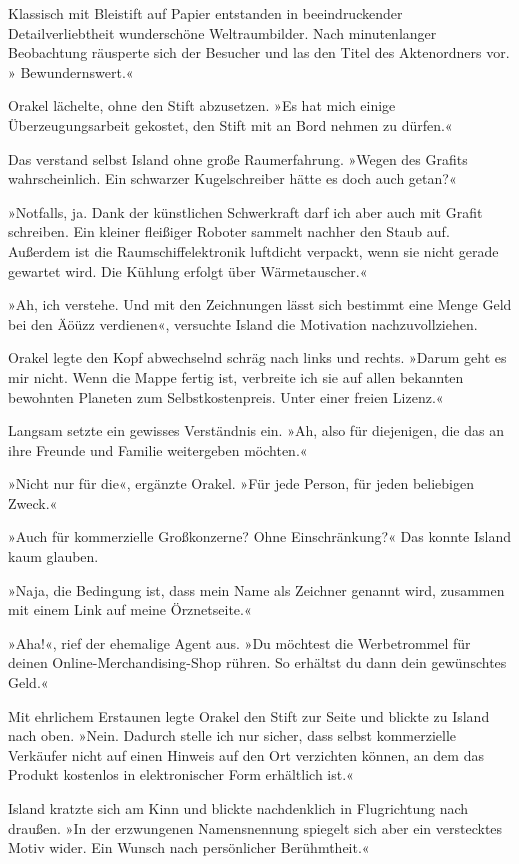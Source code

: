 Klassisch mit Bleistift auf Papier entstanden in beeindruckender Detailverliebtheit wunderschöne Weltraumbilder. Nach minutenlanger Beobachtung räusperte sich der Besucher und las den Titel des Aktenordners vor. » Bewundernswert.«

Orakel lächelte, ohne den Stift abzusetzen. »Es hat mich einige Überzeugungsarbeit gekostet, den Stift mit an Bord nehmen zu dürfen.«

Das verstand selbst Island ohne große Raumerfahrung. »Wegen des Grafits wahrscheinlich. Ein schwarzer Kugelschreiber hätte es doch auch getan?«

»Notfalls, ja. Dank der künstlichen Schwerkraft darf ich aber auch mit Grafit schreiben. Ein kleiner fleißiger Roboter sammelt nachher den Staub auf. Außerdem ist die Raumschiffelektronik luftdicht verpackt, wenn sie nicht gerade gewartet wird. Die Kühlung erfolgt über Wärmetauscher.«

»Ah, ich verstehe. Und mit den Zeichnungen lässt sich bestimmt eine Menge Geld bei den Äöüzz verdienen«, versuchte Island die Motivation nachzuvollziehen.

Orakel legte den Kopf abwechselnd schräg nach links und rechts. »Darum geht es mir nicht. Wenn die Mappe fertig ist, verbreite ich sie auf allen bekannten bewohnten Planeten zum Selbstkostenpreis. Unter einer freien Lizenz.«

Langsam setzte ein gewisses Verständnis ein. »Ah, also für diejenigen, die das an ihre Freunde und Familie weitergeben möchten.«

»Nicht nur für die«, ergänzte Orakel. »Für jede Person, für jeden beliebigen Zweck.«

»Auch für kommerzielle Großkonzerne? Ohne Einschränkung?« Das konnte Island kaum glauben.

»Naja, die Bedingung ist, dass mein Name als Zeichner genannt wird, zusammen mit einem Link auf meine Örznetseite.«

»Aha!«, rief der ehemalige Agent aus. »Du möchtest die Werbetrommel für deinen Online-Merchandising-Shop rühren. So erhältst du dann dein gewünschtes Geld.«

Mit ehrlichem Erstaunen legte Orakel den Stift zur Seite und blickte zu Island nach oben. »Nein. Dadurch stelle ich nur sicher, dass selbst kommerzielle Verkäufer nicht auf einen Hinweis auf den Ort verzichten können, an dem das Produkt kostenlos in elektronischer Form erhältlich ist.«

Island kratzte sich am Kinn und blickte nachdenklich in Flugrichtung nach draußen. »In der erzwungenen Namensnennung spiegelt sich aber ein verstecktes Motiv wider. Ein Wunsch nach persönlicher Berühmtheit.«


